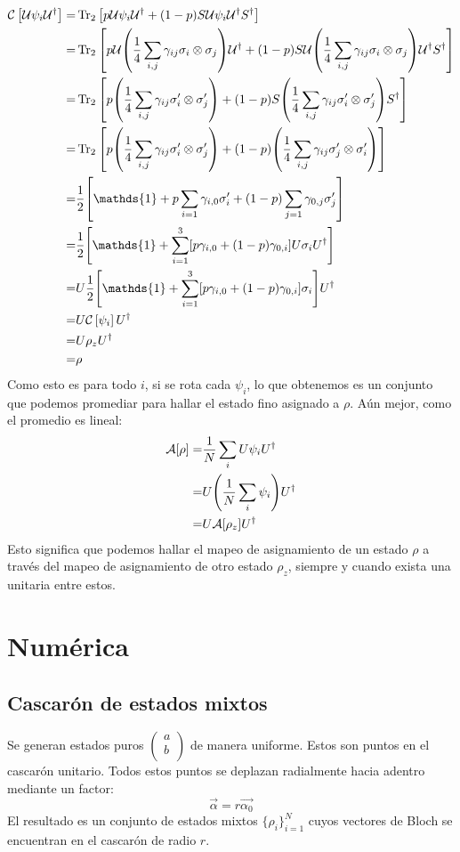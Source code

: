 \documentclass[onecolumn,11pt]{article}
\newcommand{\mcU}{\mathcal{U}}
\newcommand{\mcC}{\mathcal{C}}
\newcommand{\mcA}{\mathcal{A}}
\newcommand{\Id}{\mathds{1}}%
\newcommand{\CG}[1]{\mcC\left[#1\right]}
\begin{document}
\begin{align*}
\CG{\mcU \psi_{i} \mcU^{\dag}}=&\Tr_{2}\qty[p\mcU\psi_{i}\mcU^{\dag}+(1-p)S\mcU \psi_{i} \mcU^{\dag}S^{\dag}]\\
=&\Tr_{2}\qty[p\mcU\qty(\frac{1}{4}\sum_{i,j}\gamma_{ij} \sigma_i\otimes\sigma_j)\mcU^{\dag}+(1-p) S\mcU \qty(\frac{1}{4}\sum_{i,j}\gamma_{ij} \sigma_i\otimes\sigma_j) \mcU^{\dag} S^{\dag}]\\
=&\Tr_{2}\qty[p\qty(\frac{1}{4}\sum_{i,j}\gamma_{ij} \sigma_{i}'\otimes\sigma_{j}')+(1-p)S \qty(\frac{1}{4}\sum_{i,j}\gamma_{ij} \sigma_{i}'\otimes\sigma_{j}')S^{\dag}]\\
=&\Tr_{2}\qty[p\qty(\frac{1}{4}\sum_{i,j}\gamma_{ij} \sigma_{i}'\otimes\sigma_{j}')+(1-p)\qty(\frac{1}{4}\sum_{i,j}\gamma_{ij} \sigma_{j}'\otimes\sigma_{i}')]\\
=&\frac{1}{2}\qty[\Id +p\sum_{i=1}\gamma_{i,0}\sigma_{i}'+(1-p)\sum_{j=1}\gamma_{0,j}\sigma_{j}']\\
=&\frac{1}{2}\qty[\Id + \sum_{i=1}^3[p\gamma_{i,0}+(1-p)\gamma_{0,i}]U\sigma_{i}U^{\dag}]\\
=&U\frac{1}{2}\qty[\Id + \sum_{i=1}^3[p\gamma_{i,0}+(1-p)\gamma_{0,i}]\sigma_{i}]U^{\dag}\\
=&U\CG{\psi_{i}}U^{\dag}\\
=&U\rho_{z}U^{\dag}\\
=&\rho
\end{align*}
Como esto es para todo $i$, si se rota cada $\psi_{i}$, lo que obtenemos es un conjunto que podemos promediar para hallar el estado fino asignado a $\rho$. Aún mejor, como el promedio es lineal:
\begin{align}
\mcA[\rho]=&\frac{1}{N}\sum_{i}U\psi_{i}U^{\dag}\\
=&U\qty(\frac{1}{N}\sum_{i}\psi_{i})U^{\dag}\\
=&U\mcA[\rho_{z}]U^{\dag}
\end{align}
Esto significa que podemos hallar el mapeo de asignamiento de un estado $\rho$ a través del mapeo de asignamiento de otro estado $\rho_{z}$, siempre y cuando exista una unitaria entre estos.


\section{Numérica}
\subsection{Cascarón de estados mixtos}
Se generan estados puros $\begin{pmatrix}
a\\
b\\ \end{pmatrix}$ de manera uniforme. Estos son puntos en el cascarón unitario. Todos estos puntos se deplazan radialmente hacia adentro mediante un factor:
\begin{equation}
\vec{\alpha}=r\vec{\alpha_{0}}
\end{equation}
El resultado es un conjunto de estados mixtos $\{\rho_{i}\}_{i=1}^{N}$ cuyos vectores de Bloch se encuentran en el cascarón de radio $r$.
\end{document}
